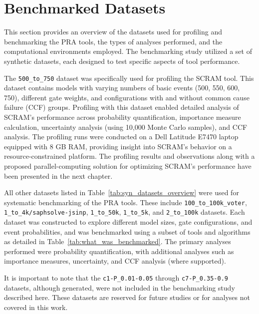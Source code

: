 \section{Benchmarked Datasets}
\label{sec:benchmarked-datasets}


This section provides an overview of the datasets used for profiling and benchmarking the PRA tools, the types of analyses performed, and the computational environments employed. The benchmarking study utilized a set of synthetic datasets, each designed to test specific aspects of tool performance.

The \texttt{500\_to\_750} dataset was specifically used for profiling the SCRAM tool. This dataset contains models with varying numbers of basic events (500, 550, 600, 750), different gate weights, and configurations with and without common cause failure (CCF) groups. Profiling with this dataset enabled detailed analysis of SCRAM's performance across probability quantification, importance measure calculation, uncertainty analysis (using 10,000 Monte Carlo samples), and CCF analysis. The profiling runs were conducted on a Dell Latitude E7470 laptop equipped with 8 GB RAM, providing insight into SCRAM's behavior on a resource-constrained platform. The profiling results and observations along with a proposed parallel-computing solution for optimizing SCRAM’s performance have been presented in the next chapter.

All other datasets listed in Table~\ref{tab:syn_datasets_overview} were used for systematic benchmarking of the PRA tools. These include \texttt{100\_to\_100k\_voter}, \texttt{1\_to\_4k/saphsolve-jsinp}, \texttt{1\_to\_50k}, \texttt{1\_to\_5k}, and \texttt{2\_to\_100k} datasets. Each dataset was constructed to explore different model sizes, gate configurations, and event probabilities, and was benchmarked using a subset of tools and algorithms as detailed in Table~\ref{tab:what_was_benchmarked}. The primary analyses performed were probability quantification, with additional analyses such as importance measures, uncertainty, and CCF analysis (where supported).

It is important to note that the \texttt{c1-P\_0.01-0.05} through \texttt{c7-P\_0.35-0.9} datasets, although generated, were not included in the benchmarking study described here. These datasets are reserved for future studies or for analyses not covered in this work.


